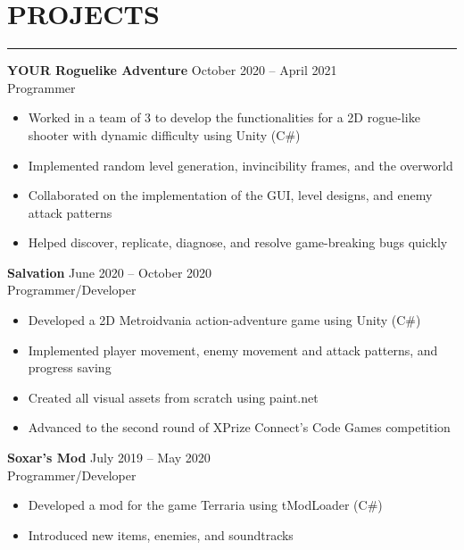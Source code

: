 \documentclass{article}
\begin{document}
\section*{PROJECTS} \vspace{-6pt} \hrule \vspace{6pt}
\textbf{YOUR Roguelike Adventure} \hfill October 2020 -- April 2021\\
Programmer
\begin{itemize}
	\item\vspace{-6pt} Worked in a team of 3 to develop the functionalities for a 2D rogue-like shooter with dynamic difficulty using Unity (C$\#$)
	\item\vspace{-6pt} Implemented random level generation, invincibility frames, and the overworld
	\item\vspace{-6pt} Collaborated on the implementation of the GUI, level designs, and enemy attack patterns
	\item\vspace{-6pt} Helped discover, replicate, diagnose, and resolve game-breaking bugs quickly
\end{itemize}
\vspace{-6pt}
\textbf{Salvation} \hfill June 2020 -- October 2020\\
Programmer/Developer
\begin{itemize}
	\item\vspace{-6pt} Developed a 2D Metroidvania action-adventure game using Unity (C$\#$)
	\item\vspace{-6pt} Implemented player movement, enemy movement and attack patterns, and progress saving
	\item\vspace{-6pt} Created all visual assets from scratch using paint.net
	\item\vspace{-6pt} Advanced to the second round of XPrize Connect's Code Games competition

\end{itemize}
\vspace{-6pt}
\textbf{Soxar's Mod} \hfill July 2019 -- May 2020\\
Programmer/Developer
\begin{itemize}
	\item\vspace{-6pt} Developed a mod for the game Terraria using tModLoader (C$\#$)
	\item\vspace{-6pt} Introduced new items, enemies, and soundtracks
\end{itemize}
\vspace{-20pt}
\end{document}

